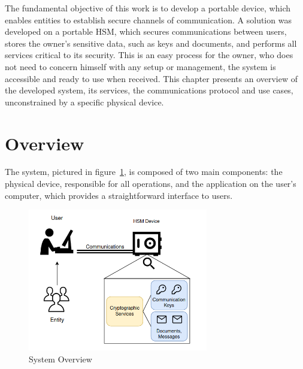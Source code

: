 \cleardoublepage
\label{chap:arch}

The fundamental objective of this work is to develop a portable device,  which enables entities to establish secure channels of communication.
A solution was developed on a portable HSM, which secures communications between users, stores the owner's sensitive data, such as keys and documents, and performs all services critical to its security. This is an easy process for the owner, who does not need to concern himself with any setup or management, the system is accessible and ready to use when received.
This chapter presents an overview of the developed system, its services, the communications protocol and use cases, unconstrained by a specific physical device.

\section{Overview}\label{chap:arch:overview}

The system, pictured in figure~\ref{fig:overview}, is composed of two main components: the physical device, responsible for all operations, and the application on the user's computer, which provides a straightforward interface to users.

\begin{figure}[h]
    \centering
    \includegraphics[width=0.7\textwidth]{./Images/overview.png}
    \caption{System Overview}
    \label{fig:overview}
\end{figure}

